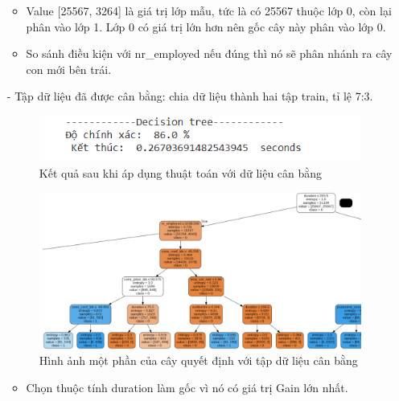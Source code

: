 \documentclass{report}
\begin{document}
\begin{enumerate}
\begin{itemize}
            \item Value [25567, 3264] là giá trị lớp mẫu, tức là có 25567 thuộc lớp 0, còn lại phân vào lớp 1. Lớp 0 có giá trị lớn hơn nên gốc cây này phân vào lớp 0.
            \item So sánh điều kiện với nr\_employed nếu đúng thì nó sẽ phân nhánh ra cây con mới bên trái.
    \end{itemize}
    \item [- ]	Tập dữ liệu đã được cân bằng: chia dữ liệu thành hai tập train, tỉ lệ 7:3.
         \begin{center}
        \begin{figure}[htp]
    	\begin{center}
    		\includegraphics[scale =1]{images/dt_smo.PNG}
    	\end{center}
    		\caption{Kết quả sau khi áp dụng thuật toán với dữ liệu cân bằng}
    \end{figure}
        \end{center}
         \begin{center}
        \begin{figure}[htp]
    	\begin{center}
    		\includegraphics[scale =0.45]{images/tree_gra_smo.PNG}
    	\end{center}
    		\caption{Hình ảnh một phần của cây quyết định với tập dữ liệu cân bằng}
    \end{figure}
        \end{center} 
               \begin{itemize}
            \item Chọn thuộc tính duration làm gốc vì nó có giá trị Gain lớn nhất.

\end{itemize}
\end{enumerate}
\end{document}
